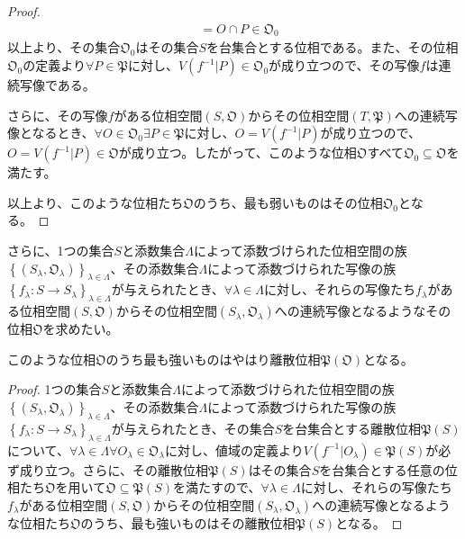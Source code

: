 \documentclass[dvipdfmx]{jsarticle}
\begin{document}
\begin{proof}
\begin{align*}
&= O \cap P \in \mathfrak{O}_{0}
\end{align*}
以上より、その集合$\mathfrak{O}_{0}$はその集合$S$を台集合とする位相である。また、その位相$\mathfrak{O}_{0}$の定義より$\forall P \in \mathfrak{P}$に対し、$V\left( f^{- 1}|P \right) \in \mathfrak{O}_{0}$が成り立つので、その写像$f$は連続写像である。\par
さらに、その写像$f$がある位相空間$\left( S,\mathfrak{O} \right)$からその位相空間$\left( T,\mathfrak{P} \right)$への連続写像となるとき、$\forall O \in \mathfrak{O}_{0}\exists P \in \mathfrak{P}$に対し、$O = V\left( f^{- 1}|P \right)$が成り立つので、$O = V\left( f^{- 1}|P \right)\in \mathfrak{O}$が成り立つ。したがって、このような位相$\mathfrak{O}$すべて$\mathfrak{O}_{0}\subseteq \mathfrak{O}$を満たす。\par
以上より、このような位相たち$\mathfrak{O}$のうち、最も弱いものはその位相$\mathfrak{O}_{0}$となる。
\end{proof}\par
さらに、1つの集合$S$と添数集合$\varLambda$によって添数づけられた位相空間の族$\left\{ \left( S_{\lambda},\mathfrak{O}_{\lambda} \right) \right\}_{\lambda \in \varLambda}$、その添数集合$\varLambda$によって添数づけられた写像の族$\left\{ f_{\lambda}:S \rightarrow S_{\lambda} \right\}_{\lambda \in \varLambda}$が与えられたとき、$\forall\lambda \in \varLambda$に対し、それらの写像たち$f_{\lambda}$がある位相空間$\left( S,\mathfrak{O} \right)$からその位相空間$\left( S_{\lambda},\mathfrak{O}_{\lambda} \right)$への連続写像となるようなその位相$\mathfrak{O}$を求めたい。
\begin{thm}\label{8.1.4.3}
このような位相$\mathfrak{O}$のうち最も強いものはやはり離散位相$\mathfrak{P}\left( \mathfrak{O} \right)$となる。
\end{thm}
\begin{proof}
1つの集合$S$と添数集合$\varLambda$によって添数づけられた位相空間の族$\left\{ \left( S_{\lambda},\mathfrak{O}_{\lambda} \right) \right\}_{\lambda \in \varLambda}$、その添数集合$\varLambda$によって添数づけられた写像の族$\left\{ f_{\lambda}:S \rightarrow S_{\lambda} \right\}_{\lambda \in \varLambda}$が与えられたとき、その集合$S$を台集合とする離散位相$\mathfrak{P}(S)$について、$\forall\lambda \in \varLambda\forall O_{\lambda} \in \mathfrak{O}_{\lambda}$に対し、値域の定義より$V\left( f^{- 1}|O_{\lambda} \right)\in \mathfrak{P}(S)$が必ず成り立つ。さらに、その離散位相$\mathfrak{P}(S)$はその集合$S$を台集合とする任意の位相たち$\mathfrak{O}$を用いて$\mathfrak{O \subseteq P}(S)$を満たすので、$\forall\lambda \in \varLambda$に対し、それらの写像たち$f_{\lambda}$がある位相空間$\left( S,\mathfrak{O} \right)$からその位相空間$\left( S_{\lambda},\mathfrak{O}_{\lambda} \right)$への連続写像となるような位相たち$\mathfrak{O}$のうち、最も強いものはその離散位相$\mathfrak{P}(S)$となる。
\end{proof}
\end{document}

